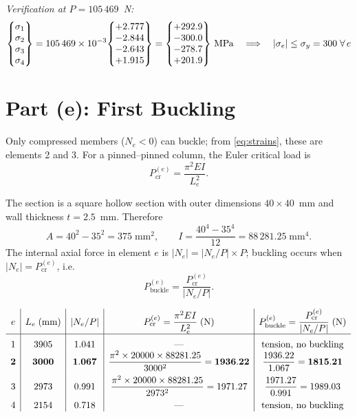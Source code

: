 \documentclass[11pt, a4paper]{article}
\begin{document}
\noindent\textit{Verification at $P=105\,469$~N:}
\[
\begin{Bmatrix} \sigma_1 \\ \sigma_2 \\ \sigma_3 \\ \sigma_4 \end{Bmatrix}
= 105\,469 \times 10^{-3}\!
\begin{Bmatrix} +2.777 \\ -2.844 \\ -2.643 \\ +1.915 \end{Bmatrix}
=
\begin{Bmatrix} +292.9 \\ -300.0 \\ -278.7 \\ +201.9 \end{Bmatrix}
\text{\,MPa}
\quad\Longrightarrow\quad |\sigma_e| \le \sigma_y = 300\;\forall\, e
\]

\section{Part (e): First Buckling}\label{sec:parte}

Only compressed members ($N_e<0$) can buckle; from \cref{eq:strains}, these are elements 2 and 3.  For a pinned--pinned column, the Euler critical load is
\begin{equation}\label{eq:euler}
P_{\text{cr}}^{(e)} = \frac{\pi^2 E I}{L_e^2}.
\end{equation}

The section is a square hollow section with outer dimensions $40\times40$~mm and wall thickness $t=2.5$~mm.  Therefore
\[
A = 40^2-35^2 = 375\;\text{mm}^2,\qquad
I = \frac{40^4-35^4}{12} = 88\,281.25\;\text{mm}^4.
\]
The internal axial force in element $e$ is $|N_e|=|N_e/P|\times P$; buckling occurs when $|N_e|=P_{\text{cr}}^{(e)}$, i.e.
\[
P_{\text{buckle}}^{(e)} = \frac{P_{\text{cr}}^{(e)}}{|N_e/P|}.
\]

\[
\begin{array}{c|c|c|c|c}
e & L_e\;\text{(mm)} & |N_e/P| & P_{\text{cr}}^{(e)} = \dfrac{\pi^2 EI}{L_e^2}\;\text{(N)} & P_{\text{buckle}}^{(e)}=\dfrac{P_{\text{cr}}^{(e)}}{|N_e/P|}\;\text{(N)} \\[6pt]
\hline\rule{0pt}{14pt}
1 & 3905 & 1.041 & \text{---} & \text{tension, no buckling} \\
\mathbf{2} & \mathbf{3000} & \mathbf{1.067} & \dfrac{\pi^2\times20000\times88281.25}{3000^2} = \mathbf{1936.22} & \dfrac{1936.22}{1.067} = \mathbf{1815.21} \\[8pt]
3 & 2973 & 0.991 & \dfrac{\pi^2\times20000\times88281.25}{2973^2} = 1971.27 & \dfrac{1971.27}{0.991} = 1989.03 \\[8pt]
4 & 2154 & 0.718 & \text{---} & \text{tension, no buckling}
\end{array}
\]
\end{document}

